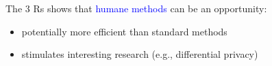 \documentclass[aspectratio=169]{beamer}
\begin{document}
\begin{frame}

The 3 Rs shows that \textcolor{blue}{humane methods} can be an opportunity:
\pause
\begin{itemize}
\item potentially more efficient than standard methods
\pause
\item stimulates interesting research (e.g., differential privacy)
\end{itemize}

\end{frame}
\frame{\titlepage}
\end{document}
